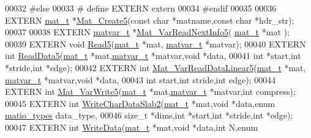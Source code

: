\begin{DoxyCode}
00032 \textcolor{preprocessor}{#else}
00033 \textcolor{preprocessor}{#   define EXTERN extern}
00034 \textcolor{preprocessor}{#endif}
00035 
00036 EXTERN \hyperlink{struct__mat__t}{mat\_t}    *\hyperlink{mat5_8c_aacff52cdf3427b35a54c111fa3d7bb21}{Mat\_Create5}(\textcolor{keyword}{const} \textcolor{keywordtype}{char} *matname,\textcolor{keyword}{const} \textcolor{keywordtype}{char} *hdr\_str);
00037 
00038 EXTERN \hyperlink{group___m_a_t_structmatvar__t}{matvar\_t} *\hyperlink{mat5_8c_a5defc934cf088b13347e50ea7f276ea3}{Mat\_VarReadNextInfo5}( \hyperlink{struct__mat__t}{mat\_t} *mat );
00039 EXTERN \textcolor{keywordtype}{void}      \hyperlink{mat5_8c_abd8669832a02e759fe190bf2724f60ae}{Read5}(\hyperlink{struct__mat__t}{mat\_t} *mat, \hyperlink{group___m_a_t_structmatvar__t}{matvar\_t} *matvar);
00040 EXTERN \textcolor{keywordtype}{int}       \hyperlink{mat5_8c_af8a259573b7b3a89555c5a9bc1860e19}{ReadData5}(\hyperlink{struct__mat__t}{mat\_t} *mat,\hyperlink{group___m_a_t_structmatvar__t}{matvar\_t} *matvar,\textcolor{keywordtype}{void} *data,
00041                      \textcolor{keywordtype}{int} *start,\textcolor{keywordtype}{int} *stride,\textcolor{keywordtype}{int} *edge);
00042 EXTERN \textcolor{keywordtype}{int}       \hyperlink{group___m_a_t_ga9c81a102772919ad4841c37e4907e712}{Mat\_VarReadDataLinear5}(\hyperlink{struct__mat__t}{mat\_t} *mat,
      \hyperlink{group___m_a_t_structmatvar__t}{matvar\_t} *matvar,\textcolor{keywordtype}{void} *data,
00043                      \textcolor{keywordtype}{int} start,\textcolor{keywordtype}{int} stride,\textcolor{keywordtype}{int} edge);
00044 EXTERN \textcolor{keywordtype}{int}       \hyperlink{mat5_8c_a4d546a62c4b429d9b94fe873015e6a24}{Mat\_VarWrite5}(\hyperlink{struct__mat__t}{mat\_t} *mat,\hyperlink{group___m_a_t_structmatvar__t}{matvar\_t} *matvar,\textcolor{keywordtype}{int} compress);
00045 EXTERN \textcolor{keywordtype}{int}       \hyperlink{mat5_8c_a5afeaabef5e10f73a5805ce6de4acc8b}{WriteCharDataSlab2}(\hyperlink{struct__mat__t}{mat\_t} *mat,\textcolor{keywordtype}{void} *data,\textcolor{keyword}{enum} 
      \hyperlink{group___m_a_t_gacf7b3b879282b7ab3a51190e49bf3453}{matio\_types} data\_type,
00046                      \textcolor{keywordtype}{size\_t} *dims,\textcolor{keywordtype}{int} *start,\textcolor{keywordtype}{int} *stride,\textcolor{keywordtype}{int} *edge);
00047 EXTERN \textcolor{keywordtype}{int}       \hyperlink{mat5_8c_a1bec2ccf2a3b48706edd32e63744d364}{WriteData}(\hyperlink{struct__mat__t}{mat\_t} *mat,\textcolor{keywordtype}{void} *data,\textcolor{keywordtype}{int} N,\textcolor{keyword}{enum} 

\end{DoxyCode}
